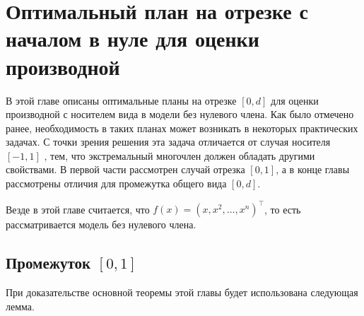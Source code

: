 \documentclass[specialist,
               substylefile = spbu.rtx,
               subf,href,colorlinks=true, 12pt]{disser}
\theoremstyle{definition}
\begin{document}
	
	
	
	
	
	
  
	\chapter{Оптимальный план на отрезке с началом в нуле для оценки производной}
  
  В этой главе описаны оптимальные планы на отрезке $[0, d]$ для оценки производной с носителем вида в модели без нулевого члена. Как было отмечено ранее, необходимость в таких планах может возникать в некоторых практических задачах. С точки зрения решения эта задача отличается от случая носителя $[-1, 1]$ \cite{melasmain}, тем, что экстремальный многочлен должен обладать другими свойствами. В первой части рассмотрен случай отрезка $[0,1]$, а в конце главы рассмотрены отличия для промежутка общего вида $[0, d]$.
  
  Везде в этой главе считается, что $f(x) = (x, x^2, \ldots, x^n)^\top$, то есть рассматривается модель без нулевого члена.
  
  \section{Промежуток $[0, 1]$}
  
  При доказательстве основной теоремы этой главы будет использована следующая лемма.
  
\end{document}
